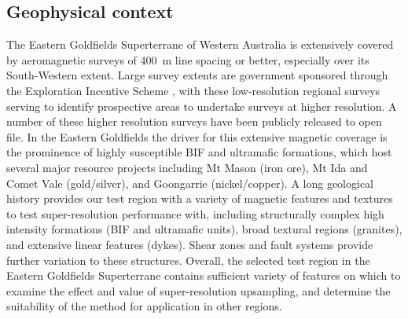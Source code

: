 \subsection{Geophysical context}
The Eastern Goldfields Superterrane of Western Australia is extensively covered by aeromagnetic surveys of \qty{400}{\metre} line spacing or better, especially over its South-Western extent.
Large survey extents are government sponsored through the Exploration Incentive Scheme \parencite[e.g.][]{griffinStimulatingGreenfieldsExploration2010}, with these low-resolution regional surveys serving to identify prospective areas to undertake surveys at higher resolution.
A number of these higher resolution surveys have been publicly released to open file.
In the Eastern Goldfields the driver for this extensive magnetic coverage is the prominence of highly susceptible BIF and ultramafic formations, which host several major resource projects including Mt Mason (iron ore), Mt Ida and Comet Vale (gold/silver), and Goongarrie (nickel/copper).
A long geological history provides our test region with a variety of magnetic features and textures to test super-resolution performance with, including structurally complex high intensity formations (BIF and ultramafic units), broad textural regions (granites), and extensive linear features (dykes).
Shear zones and fault systems provide further variation to these structures.
Overall, the selected test region in the Eastern Goldfields Superterrane contains sufficient variety of features on which to examine the effect and value of super-resolution upsampling, and determine the suitability of the method for application in other regions.

